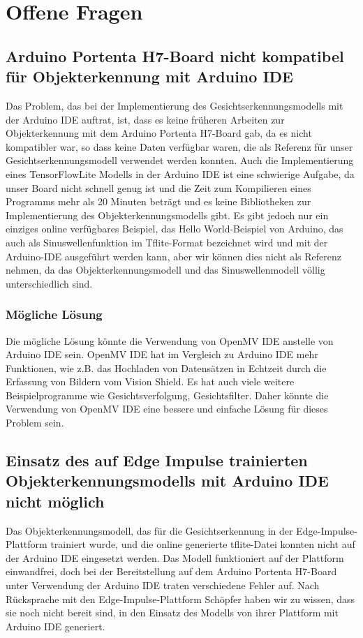 \section{Offene Fragen}

\subsection{Arduino Portenta H7-Board nicht kompatibel für Objekterkennung mit Arduino IDE}

Das Problem, das bei der Implementierung des Gesichtserkennungsmodells mit der Arduino IDE auftrat, ist, dass es keine früheren Arbeiten zur Objekterkennung mit dem Arduino Portenta H7-Board gab, da es nicht kompatibler war, so dass keine Daten verfügbar waren, die als Referenz für unser Gesichtserkennungsmodell verwendet werden konnten.\cite{GoogleTensorFlowLite:2021} Auch die Implementierung eines TensorFlowLite Modells in der Arduino IDE ist eine schwierige Aufgabe, da unser Board nicht schnell genug ist und die Zeit zum Kompilieren eines Programms mehr als 20 Minuten beträgt und es keine Bibliotheken zur Implementierung des Objekterkennungsmodells gibt. Es gibt jedoch nur ein einziges online verfügbares Beispiel, das Hello World-Beispiel von Arduino, das auch als Sinuswellenfunktion im Tflite-Format bezeichnet wird und mit der Arduino-IDE ausgeführt werden kann, aber wir können dies nicht als Referenz nehmen, da das Objekterkennungsmodell und das Sinuswellenmodell völlig unterschiedlich sind. 

\subsubsection{Mögliche Lösung}

Die mögliche Lösung könnte die Verwendung von OpenMV IDE anstelle von Arduino IDE sein. OpenMV IDE hat im Vergleich zu Arduino IDE mehr Funktionen, wie z.B. das Hochladen von Datensätzen in Echtzeit durch die Erfassung von Bildern vom Vision Shield. Es hat auch viele weitere Beispielprogramme wie Gesichtsverfolgung, Gesichtsfilter. Daher könnte die Verwendung von OpenMV IDE eine bessere und einfache Lösung für dieses Problem sein. 

\subsection{Einsatz des auf Edge Impulse trainierten Objekterkennungsmodells mit Arduino IDE nicht möglich }

Das Objekterkennungsmodell, das für die Gesichtserkennung in der Edge-Impulse-Plattform trainiert wurde, und die online generierte tflite-Datei konnten nicht auf der Arduino IDE eingesetzt werden. Das Modell funktioniert auf der Plattform einwandfrei, doch bei der Bereitstellung auf dem Arduino Portenta H7-Board unter Verwendung der Arduino IDE traten verschiedene Fehler auf. Nach Rücksprache mit den Edge-Impulse-Plattform Schöpfer haben wir zu wissen, dass sie noch nicht bereit sind, in den Einsatz des Modells von ihrer Plattform mit Arduino IDE generiert.

